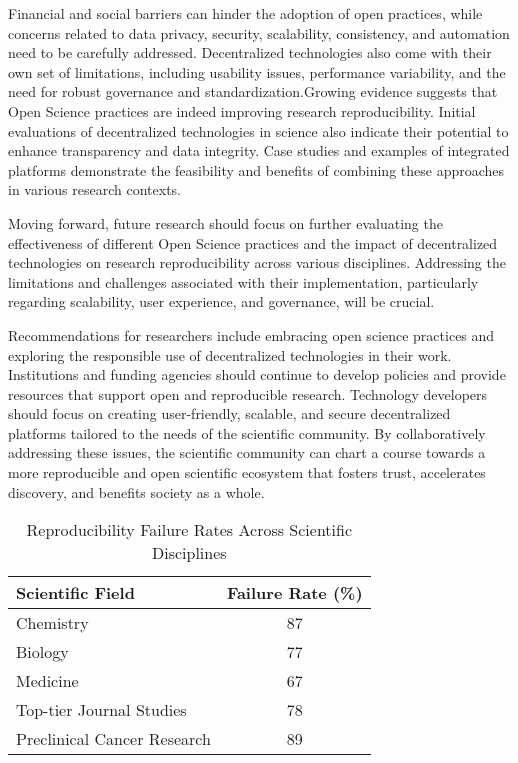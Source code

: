 Financial and social barriers can hinder the adoption of open practices, while concerns related to data privacy, security, scalability, consistency, and automation need to be carefully addressed. Decentralized technologies also come with their own set of limitations, including usability issues, performance variability, and the need for robust governance and standardization.Growing evidence suggests that Open Science practices are indeed improving research reproducibility. Initial evaluations of decentralized technologies in science also indicate their potential to enhance transparency and data integrity. Case studies and examples of integrated platforms demonstrate the feasibility and benefits of combining these approaches in various research contexts.

Moving forward, future research should focus on further evaluating the effectiveness of different Open Science practices and the impact of decentralized technologies on research reproducibility across various disciplines. Addressing the limitations and challenges associated with their implementation, particularly regarding scalability, user experience, and governance, will be crucial.

Recommendations for researchers include embracing open science practices and exploring the responsible use of decentralized technologies in their work. Institutions and funding agencies should continue to develop policies and provide resources that support open and reproducible research. Technology developers should focus on creating user-friendly, scalable, and secure decentralized platforms tailored to the needs of the scientific community. By collaboratively addressing these issues, the scientific community can chart a course towards a more reproducible and open scientific ecosystem that fosters trust, accelerates discovery, and benefits society as a whole.


\begin{table}[h]
    \centering
    \caption{Reproducibility Failure Rates Across Scientific Disciplines}
    \begin{tabular}{|l|c|}
        \hline
        \textbf{Scientific Field}   & \textbf{Failure Rate (\%)} \\
        \hline
        Chemistry                   & 87                         \\
        Biology                     & 77                         \\
        Medicine                    & 67                         \\
        Top-tier Journal Studies    & 78                         \\
        Preclinical Cancer Research & 89                         \\
        \hline
    \end{tabular}
    \label{tab:reproducibility}
\end{table}



